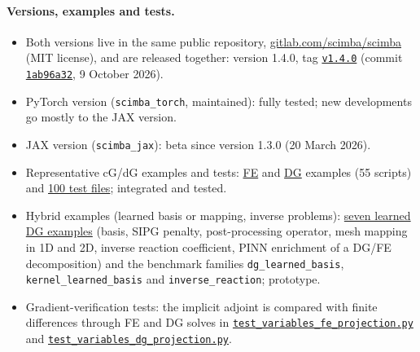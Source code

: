 \paragraph{Versions, examples and tests.}
\begin{itemize}
  \item Both versions live in the same public repository,
    \href{https://gitlab.com/scimba/scimba}{gitlab.com/scimba/scimba}
    (MIT license), and are released together: version 1.4.0, tag
    \href{https://gitlab.com/scimba/scimba/-/tags/v1.4.0}{\texttt{v1.4.0}}
    (commit \href{https://gitlab.com/scimba/scimba/-/commit/1ab96a32aa3846bb59fa01b1f41cd9372f558a1b}{\texttt{1ab96a32}},
    9 October 2026).
  \item  PyTorch   version  (\texttt{scimba\_torch}, maintained):  fully
    tested; new developments go mostly to the JAX version.
  \item JAX version (\texttt{scimba\_jax}): beta since version 1.3.0
    (20 March 2026).
  \item  Representative   cG/dG   examples   and   tests:
    \href{https://gitlab.com/scimba/scimba/-/tree/1ab96a32aa3846bb59fa01b1f41cd9372f558a1b/examples/examples_jax/fem}{FE} and
    \href{https://gitlab.com/scimba/scimba/-/tree/1ab96a32aa3846bb59fa01b1f41cd9372f558a1b/examples/examples_jax/dg}{DG} examples (55 scripts) and
    \href{https://gitlab.com/scimba/scimba/-/tree/1ab96a32aa3846bb59fa01b1f41cd9372f558a1b/tests/test_jax/linear_approximation}{100 test files};
    integrated and tested.
  \item Hybrid  examples (learned basis or  mapping, inverse problems):
    \href{https://gitlab.com/scimba/scimba/-/tree/1ab96a32aa3846bb59fa01b1f41cd9372f558a1b/examples/examples_jax/dg/learnable_approach}{seven learned
    DG examples} (basis, SIPG penalty, post-processing operator, mesh
    mapping in 1D and 2D, inverse reaction coefficient, PINN enrichment of
    a DG/FE decomposition) and the benchmark families
    \texttt{dg\_learned\_basis}, \texttt{kernel\_learned\_basis} and
    \texttt{inverse\_reaction}; prototype.
  \item   Gradient-verification   tests: the implicit adjoint is
    compared with finite differences through FE and DG solves in
    \href{https://gitlab.com/scimba/scimba/-/blob/1ab96a32aa3846bb59fa01b1f41cd9372f558a1b/tests/test_jax/linear_approximation/test_variables_fe_projection.py}{\texttt{test\_variables\_fe\_projection.py}}
    and
    \href{https://gitlab.com/scimba/scimba/-/blob/1ab96a32aa3846bb59fa01b1f41cd9372f558a1b/tests/test_jax/linear_approximation/test_variables_dg_projection.py}{\texttt{test\_variables\_dg\_projection.py}}.
\end{itemize}

